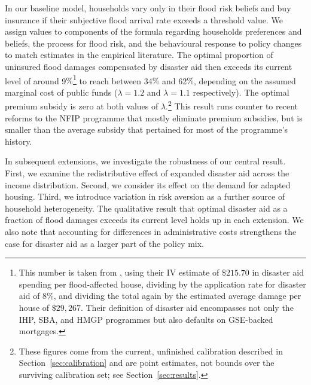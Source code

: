 \documentclass[12pt]{article}
\begin{document}
In our baseline model, households vary only in their flood risk beliefs and buy insurance if their subjective flood arrival rate exceeds a threshold value. We assign values to components of the formula regarding households preferences and beliefs, the process for flood risk, and the behavioural response to policy changes to match estimates in the empirical literature. The optimal proportion of uninsured flood damages compensated by disaster aid then exceeds its current level of around 9$\%$\footnote{This number is taken from \cite{gruber2026optimal}, using their IV estimate of $\$215.70$ in disaster aid spending per flood-affected house, dividing by the application rate for disaster aid of $8\%$, and dividing the total again by the estimated average damage per house of $\$29,267$. Their definition of disaster aid encompasses not only the IHP, SBA, and HMGP programmes but also defaults on GSE-backed mortgages.} to reach between 34$\%$ and 62$\%$, depending on the assumed marginal cost of public funds ($\lambda=1.2$ and $\lambda=1.1$ respectively). The optimal premium subsidy is zero at both values of $\lambda$.\footnote{These figures come from the current, unfinished calibration described in Section~\ref{sec:calibration} and are point estimates, not bounds over the surviving calibration set; see Section~\ref{sec:results}.} This result runs counter to recent reforms to the NFIP programme that mostly eliminate premium subsidies, but is smaller than the average subsidy that pertained for most of the programme's history.

In subsequent extensions, we investigate the robustness of our central result. First, we examine the redistributive effect of expanded disaster aid across the income distribution. Second, we consider its effect on the demand for adapted housing. Third, we introduce variation in risk aversion as a further source of household heterogeneity. The qualitative result that optimal disaster aid as a fraction of flood damages exceeds its current level holds up in each extension. We also note that accounting for differences in administrative costs strengthens the case for disaster aid as a larger part of the policy mix.
\end{document}
